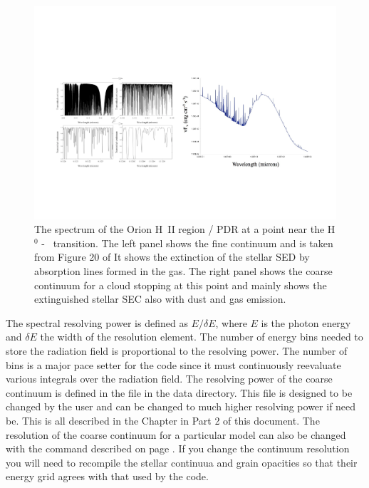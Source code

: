 \begin{figure}
\centering
\includegraphics[scale=0.6]{CoarseFineContinua}
\caption[Orion Spectrum]{\label{fig:CoarseFineContinua}The spectrum of the Orion H~II region / PDR
at a point near the H$^0$ - \htwo\ transition.
The left panel shows the fine continuum and is taken from Figure 20 of \citet{Shaw2005}
It shows the extinction of the stellar SED by absorption lines formed in the gas.
The right panel shows the coarse continuum for a cloud stopping at this point and
mainly shows the extinguished stellar SEC also with dust and gas emission.}
\end{figure}

The spectral resolving power is defined as $E/\delta E$, where $E$ is the
photon energy and $\delta E$ the width of the resolution element.  The number
of energy bins needed to store the radiation field is proportional to the
resolving power.  The number of bins is a major pace setter for the code since it
must continuously reevaluate various integrals over the radiation field.
The resolving power of the
coarse continuum is defined in the file 
in the data directory.
This file is designed to be changed by the user and can be
changed to much higher resolving power if need be.  This is all described in
the Chapter  in Part 2 of this document.
The resolution of the coarse continuum for a particular model can also be changed with the 
 command described on 
page \pageref{sec:CommandSetContinuumOptions}.
If you change the continuum resolution you will need to recompile
the stellar continuua and grain opacities so that their energy grid
agrees with that used by the code.

